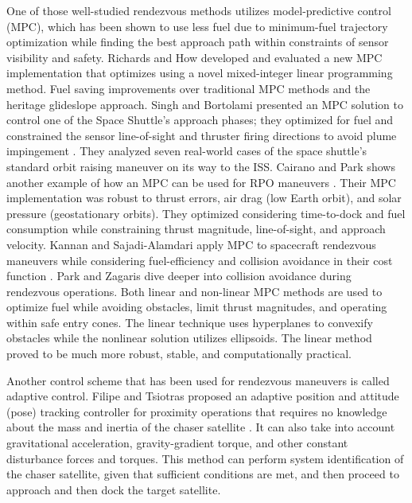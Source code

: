 \documentclass[letterpaper, preprint, paper,11pt]{AAS}	%
\begin{document}
One of those well-studied rendezvous methods utilizes model-predictive control (MPC), which has been shown to use less fuel due to minimum-fuel trajectory optimization while finding the best approach path within constraints of sensor visibility and safety. Richards and How developed and evaluated a new MPC implementation that optimizes using a novel mixed-integer linear programming method\cite{richards_how_MPC}. Fuel saving improvements over traditional MPC methods and the heritage glideslope approach. Singh and Bortolami presented an MPC solution to control one of the Space Shuttle's approach phases; they optimized for fuel and constrained the sensor line-of-sight and thruster firing directions to avoid plume impingement \cite{singh_bortolami_MPC}. They analyzed seven real-world cases of the space shuttle's standard orbit raising maneuver on its way to the ISS. Cairano and Park shows another example of how an MPC can be used for RPO maneuvers \cite{cairano_park_MPCApproach}. Their MPC implementation was robust to thrust errors, air drag (low Earth orbit), and solar pressure (geostationary orbits). They optimized considering time-to-dock and fuel consumption while constraining thrust magnitude, line-of-sight, and approach velocity. Kannan and Sajadi-Alamdari apply MPC to spacecraft rendezvous maneuvers while considering fuel-efficiency and collision avoidance in their cost function \cite{kannan_sajadi_MPC}. Park and Zagaris dive deeper into collision avoidance during rendezvous operations. Both linear and non-linear MPC methods are used to optimize fuel while avoiding obstacles, limit thrust magnitudes, and operating within safe entry cones. The linear technique uses hyperplanes to convexify obstacles while the nonlinear solution utilizes ellipsoids. The linear method proved to be much more robust, stable, and computationally practical.

Another control scheme that has been used for rendezvous maneuvers is called adaptive control. Filipe and Tsiotras proposed an adaptive position and attitude (pose) tracking controller for proximity operations that requires no knowledge about the mass and inertia of the chaser satellite \cite{filipe_tsiotras_dualQ}. It can also take into account gravitational acceleration, gravity-gradient torque, and other constant disturbance forces and torques. This method can perform system identification of the chaser satellite, given that sufficient conditions are met, and then proceed to approach and then dock the target satellite. 
\end{document}
